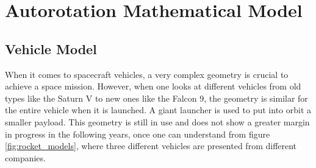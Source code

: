
\chapter{Autorotation Mathematical Model}
\label{chapter:mathematical_model}


\section{Vehicle Model}
\label{section:model}

When it comes to spacecraft vehicles, a very complex geometry is crucial to achieve a space mission. However, when one looks at different vehicles from old types like the Saturn V to new ones like the Falcon 9, the geometry is similar for the entire vehicle when it is launched. A giant launcher is used to put into orbit a smaller payload. This geometry is still in use and does not show a greater margin in progress in the following years, once one can understand from figure \ref{fig:rocket_models}, where three different vehicles are presented from different companies.

